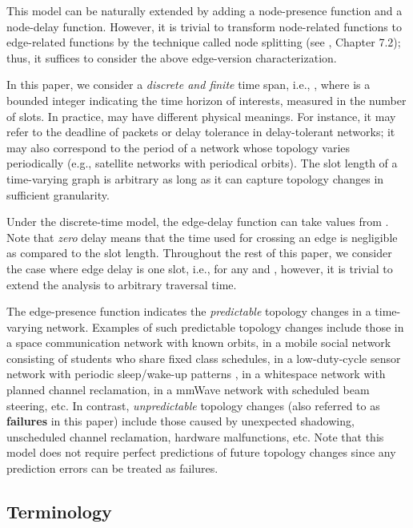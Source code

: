 \documentclass[10pt, conference, letterpaper]{IEEEtran}
\begin{document}
\noindent This model can be naturally extended by adding a node-presence function and a node-delay function. However, it is trivial to transform node-related functions to edge-related functions by the technique called node splitting (see \cite{LP}, Chapter 7.2); thus, it suffices to consider the above edge-version characterization.

In this paper, we consider a \emph{discrete and finite} time span, i.e., , where  is a bounded integer indicating the time horizon of interests, measured in the number of slots. In practice,  may have different physical meanings. For instance, it may refer to the deadline of packets or delay tolerance in delay-tolerant networks; it may also correspond to the period of a network whose topology varies periodically (e.g., satellite networks with periodical orbits). The slot length of a time-varying graph is arbitrary as long as it can capture topology changes in sufficient granularity.


Under the discrete-time model, the edge-delay function  can take values from . Note that \emph{zero} delay means that the time used for crossing an edge is negligible as compared to the slot length.
Throughout the rest of this paper, we consider the case where edge delay is one slot, i.e.,  for any  and , however, it is trivial to extend the analysis to arbitrary traversal time.


The edge-presence function  indicates the \emph{predictable} topology changes in a time-varying network. Examples of such predictable topology changes include those in a space communication network  with known orbits\cite{space1,space2}, in a mobile social network  consisting of students who
share fixed class schedules\cite{mobile-social}, in a low-duty-cycle sensor network with periodic sleep/wake-up patterns \cite{duty1,duty2}, in a whitespace network with planned channel reclamation\cite{whitespace1,whitespace2}, in a mmWave network  with scheduled beam steering\cite{mmWave}, etc. In contrast, \emph{unpredictable} topology changes (also referred to as \textbf{failures} in this paper) include those caused by unexpected shadowing, unscheduled channel reclamation, hardware malfunctions, etc. Note that this model does not require perfect predictions of future topology changes since any prediction errors can be treated as failures.


\subsection{Terminology}
\end{document}
